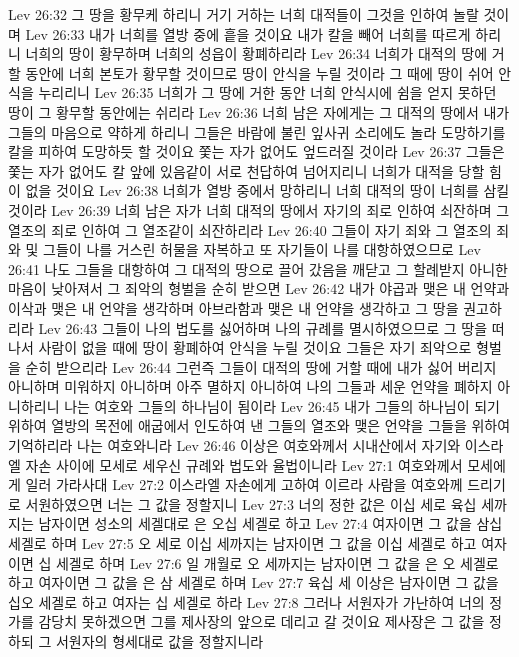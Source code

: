 Lev 26:32  그 땅을 황무케 하리니 거기 거하는 너희 대적들이 그것을 인하여 놀랄 것이며
Lev 26:33  내가 너희를 열방 중에 흩을 것이요 내가 칼을 빼어 너희를 따르게 하리니 너희의 땅이 황무하며 너희의 성읍이 황폐하리라
Lev 26:34  너희가 대적의 땅에 거할 동안에 너희 본토가 황무할 것이므로 땅이 안식을 누릴 것이라 그 때에 땅이 쉬어 안식을 누리리니
Lev 26:35  너희가 그 땅에 거한 동안 너희 안식시에 쉼을 얻지 못하던 땅이 그 황무할 동안에는 쉬리라
Lev 26:36  너희 남은 자에게는 그 대적의 땅에서 내가 그들의 마음으로 약하게 하리니 그들은 바람에 불린 잎사귀 소리에도 놀라 도망하기를 칼을 피하여 도망하듯 할 것이요 쫓는 자가 없어도 엎드러질 것이라
Lev 26:37  그들은 쫓는 자가 없어도 칼 앞에 있음같이 서로 천답하여 넘어지리니 너희가 대적을 당할 힘이 없을 것이요
Lev 26:38  너희가 열방 중에서 망하리니 너희 대적의 땅이 너희를 삼킬 것이라
Lev 26:39  너희 남은 자가 너희 대적의 땅에서 자기의 죄로 인하여 쇠잔하며 그 열조의 죄로 인하여 그 열조같이 쇠잔하리라
Lev 26:40  그들이 자기 죄와 그 열조의 죄와 및 그들이 나를 거스린 허물을 자복하고 또 자기들이 나를 대항하였으므로
Lev 26:41  나도 그들을 대항하여 그 대적의 땅으로 끌어 갔음을 깨닫고 그 할례받지 아니한 마음이 낮아져서 그 죄악의 형벌을 순히 받으면
Lev 26:42  내가 야곱과 맺은 내 언약과 이삭과 맺은 내 언약을 생각하며 아브라함과 맺은 내 언약을 생각하고 그 땅을 권고하리라
Lev 26:43  그들이 나의 법도를 싫어하며 나의 규례를 멸시하였으므로 그 땅을 떠나서 사람이 없을 때에 땅이 황폐하여 안식을 누릴 것이요 그들은 자기 죄악으로 형벌을 순히 받으리라
Lev 26:44  그런즉 그들이 대적의 땅에 거할 때에 내가 싫어 버리지 아니하며 미워하지 아니하며 아주 멸하지 아니하여 나의 그들과 세운 언약을 폐하지 아니하리니 나는 여호와 그들의 하나님이 됨이라
Lev 26:45  내가 그들의 하나님이 되기 위하여 열방의 목전에 애굽에서 인도하여 낸 그들의 열조와 맺은 언약을 그들을 위하여 기억하리라 나는 여호와니라
Lev 26:46  이상은 여호와께서 시내산에서 자기와 이스라엘 자손 사이에 모세로 세우신 규례와 법도와 율법이니라
Lev 27:1  여호와께서 모세에게 일러 가라사대
Lev 27:2  이스라엘 자손에게 고하여 이르라 사람을 여호와께 드리기로 서원하였으면 너는 그 값을 정할지니
Lev 27:3  너의 정한 값은 이십 세로 육십 세까지는 남자이면 성소의 세겔대로 은 오십 세겔로 하고
Lev 27:4  여자이면 그 값을 삼십 세겔로 하며
Lev 27:5  오 세로 이십 세까지는 남자이면 그 값을 이십 세겔로 하고 여자이면 십 세겔로 하며
Lev 27:6  일 개월로 오 세까지는 남자이면 그 값을 은 오 세겔로 하고 여자이면 그 값을 은 삼 세겔로 하며
Lev 27:7  육십 세 이상은 남자이면 그 값을 십오 세겔로 하고 여자는 십 세겔로 하라
Lev 27:8  그러나 서원자가 가난하여 너의 정가를 감당치 못하겠으면 그를 제사장의 앞으로 데리고 갈 것이요 제사장은 그 값을 정하되 그 서원자의 형세대로 값을 정할지니라
